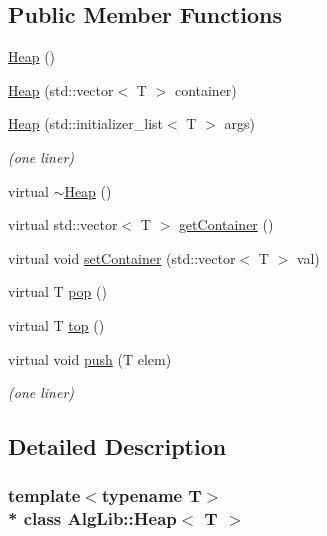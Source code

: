 \subsection*{Public Member Functions}
\begin{DoxyCompactItemize}
\item 
\hyperlink{class_alg_lib_1_1_heap_aba2cc050f886d9a8247f24347d9c9b55}{Heap} ()
\item 
\hyperlink{class_alg_lib_1_1_heap_a068f2a62a4468625b4ad14507a386fc8}{Heap} (std\+::vector$<$ T $>$ container)
\item 
\hyperlink{class_alg_lib_1_1_heap_a7b009e741c0442339eb54d992d3c74da}{Heap} (std\+::initializer\+\_\+list$<$ T $>$ args)
\begin{DoxyCompactList}\small\item\em (one liner) \end{DoxyCompactList}\item 
virtual \hyperlink{class_alg_lib_1_1_heap_a0d6a73495b76725db1d612050c090c73}{$\sim$\+Heap} ()
\item 
virtual std\+::vector$<$ T $>$ \hyperlink{class_alg_lib_1_1_heap_a26fff42a724f914607f61c25dc4f80bd}{get\+Container} ()
\item 
virtual void \hyperlink{class_alg_lib_1_1_heap_a0c406e0e00559e3372637d1547af1023}{set\+Container} (std\+::vector$<$ T $>$ val)
\item 
virtual T \hyperlink{class_alg_lib_1_1_heap_a827f1aa55e4d2b366e3c2e1753b2bb38}{pop} ()
\item 
virtual T \hyperlink{class_alg_lib_1_1_heap_a4f1ab496a7f4a4cc4d5c917fe10514ff}{top} ()
\item 
virtual void \hyperlink{class_alg_lib_1_1_heap_a37d97dc0bc90f4b1dedfaa3378133f89}{push} (T elem)
\begin{DoxyCompactList}\small\item\em (one liner) \end{DoxyCompactList}\end{DoxyCompactItemize}


\subsection{Detailed Description}
\subsubsection*{template$<$typename T$>$\\*
class Alg\+Lib\+::\+Heap$<$ T $>$}



